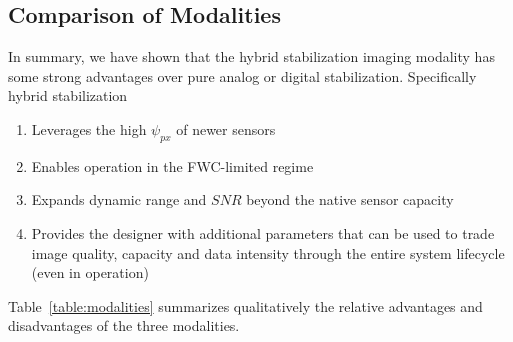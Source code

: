 \documentclass[]{spieman}  %
\begin{document}



\subsection{Comparison of Modalities}
In summary, we have shown that the hybrid stabilization imaging modality has some strong advantages over pure analog or digital stabilization.  Specifically hybrid stabilization

\begin{enumerate}
\item Leverages the high $\psi_{px}$ of newer sensors 
\item Enables operation in the FWC-limited regime 
\item Expands dynamic range and $SNR$ beyond the native sensor capacity 
\item Provides the designer with additional parameters that can be used to trade image quality, capacity and data intensity through the entire system lifecycle (even in operation)
\end{enumerate}

Table~\ref{table:modalities} summarizes qualitatively the relative advantages and disadvantages of the three modalities.
\end{document}

